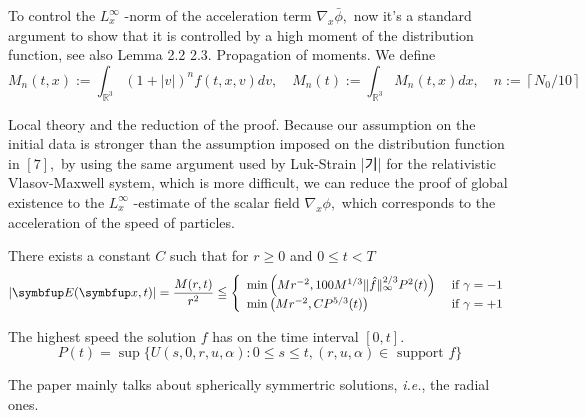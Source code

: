 To control the $L_{x}^{\infty}$ -norm of the acceleration term $\nabla_{x} \bar{\phi},$ now it's a standard argument to show that it is controlled by a high moment of the distribution function, see also Lemma 2.2
2.3. Propagation of moments. We define
\[
M_{n}(t, x):=\int_{\mathbb{R}^{3}}(1+|v|)^{n} f(t, x, v) d v, \quad M_{n}(t):=\int_{\mathbb{R}^{3}} M_{n}(t, x) d x, \quad n:=\left\lceil N_{0} / 10\right\rceil
\]



Local theory and the reduction of the proof. Because our assumption on the initial data is stronger than the assumption imposed on the distribution function in $[7],$ by using the same argument used by Luk-Strain |기| for the relativistic Vlasov-Maxwell system, which is more difficult, we can reduce the proof of global existence to the $L_{x}^{\infty}$ -estimate of the scalar field $\nabla_{x} \phi,$ which corresponds to the acceleration of the speed of particles.


\begin{lemma}
    There exists a constant $C$ such that for $r \geq 0$ and $0 \leq t<T$
    $$
    |\vE(\vx, t)|=\frac{M(r, t)}{r^{2}} \leqq\left\{\begin{array}{ll}
    {\min \left(M r^{-2}, 100 M^{1 / 3}\|\hat{f}\|_{\infty}^{2 / 3} P^{2}(t)\right)} & {\text { if } \gamma=-1} \\
    {\min \left(M r^{-2}, C P^{5 / 3}(t)\right)} & {\text { if } \gamma=+1}
    \end{array}\right.
    $$
    \end{lemma}
    

\begin{definition}
The highest speed the solution $f$ has on the time interval $[0,t]$.
$$
P(t)=\sup \{U(s, 0, r, u, \alpha): 0 \leq s \leq t,(r, u, \alpha) \in \text { support } f\}
$$
\end{definition}
    

The paper mainly talks about spherically symmertric solutions, \textit{i.e.}, the radial ones. 






